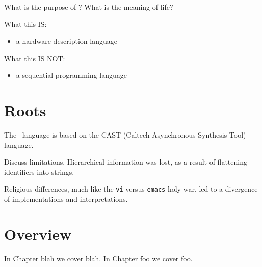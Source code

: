 What is the purpose of \hac?
What is the meaning of life?

What this IS:
\begin{itemize}
\item a hardware description language
\end{itemize}

What this IS NOT:
\begin{itemize}
\item a sequential programming language
\end{itemize}

\section{Roots}
\label{sec:intro:roots}

The \hac\ language is based on the CAST
(Caltech Asynchronous Synthesis Tool) language.  

Discuss limitations.  
Hierarchical information was lost, as a result of 
flattening identifiers into strings.  


Religious differences, much like the
\verb|vi| versus \verb|emacs| holy war, 
led to a divergence of implementations and interpretations.  


\section{Overview}
\label{sec:intro:overview}

In Chapter blah we cover blah.  
In Chapter foo we cover foo.  


